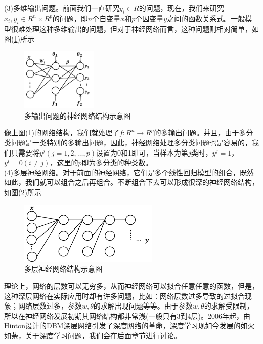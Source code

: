             \noindent (3)多维输出问题。前面我们一直研究$y_i\in R$的问题，现在，我们来研究$x_i,y_i\in R^n\times R^p$的问题，即$n$个自变量$x$和$p$个因变量$y$之间的函数关系式。一般模型很难处理这种多维输出的问题，但对于神经网络而言，这种问题则相对简单，如图(\ref{fig:多输出问题的神经网络结构示意图})所示
            \begin{figure}[H]
            \centering
            \includegraphics[height=3cm]{images/Neural_net_Structure_of_Multi_Output_Problem.jpg}
            \caption{多输出问题的神经网络结构示意图}
            \label{fig:多输出问题的神经网络结构示意图}
            \end{figure}
           像上图(\ref{fig:多输出问题的神经网络结构示意图})的网络结构，我们就处理了$f:R^n\rightarrow R^p$的多输出问题。并且，由于多分类问题是一类特别的多输出问题，因此，神经网络处理多分类问题也是容易的，我们只需要将$y^j(j=1,2,\dots,p)$设置为0和1即可，当样本为第$j$类时，$y^j = 1$，$y^i=0(i\neq j)$，这里的$p$即为多分类的种类数。\\
            (4)多层神经网络。对于前面的神经网络，它们是多个线性回归模型的组合，既然如此，我们就可以组合之后再组合。不断组合下去可以形成很深的神经网络结构，如图(\ref{fig:多层神经网络结构示意图})所示
            \begin{figure}[H]
            \centering
            \includegraphics[height=3cm]{images/Multilayer_neural_net_structure.jpg}
            \caption{多层神经网络结构示意图}
            \label{fig:多层神经网络结构示意图}
            \end{figure}
            \par
            理论上，网络的层数可以无穷多，从而神经网络可以拟合任意任意的函数，但是，这种深层网络在实际应用时却有许多问题，比如：网络层数过多导致的过拟合现象；网络层数过多，参数$w,\theta$的求解出现问题等等。由于参数$w,\theta$的求解受限制，所以在神经网络发展初期其网络结构都非常浅(一般只有3到4层)。2006年起，由Hinton设计的DBM深层网络引发了深度网络的革命，深度学习现如今发展的如火如荼，关于深度学习问题，我们会在后面章节进行讨论。\\
